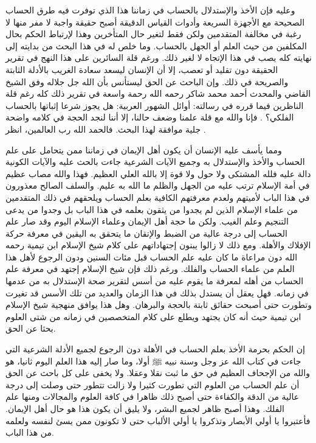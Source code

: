 وعليه فإن الأخذ والإستدلال بالحساب في زماننا هذا الذي توفرت فيه طرق الحساب الصحيحة مع الأجهزة السريعة وأدوات القياس الدقيقة أصبح حقيقة واجبة لا مفر منها لا رغبة في مخالفة المتقدمين ولكن فقط لتغير حال المتأخرين وهذا لإرتباط الحكم بحال المكلفين من حيث العلم أو الجهل بالحساب. وما خلص له في هذا البحث من بدايته إلى نهايته كله يصب في هذا الإتجاه لا لغير ذلك. ورغم قلة السائرين على هذا النهج في تقرير الحقيقة دون تقليد أو تعصب، إلا أن الإنسان ليسعد سعادة الغريب بالأدلة الثابتة والصريحة في ذلك. وإن الباحث عن الحق ليستأنس بأن الله جل جلاله وفق الشيخ القاضي والمحدث أحمد محمد شاكر رحمه الله رحمة واسعة في تقرير ذلك كله رغم قلة الناظرين فيما قرره في رسالته: أوائل الشهور العربية: هل يجوز شرعا إثباتها بالحساب الفلكي؟ \cite{shuhur_ahmidShakir}. فإنا والله مع قلة علمنا وضعف حالنا، إلا أننا  لنجد الحجة في كلامه واضحة جلية موافقة لهذا البحث. فالحمد الله رب العالمين، انظر .

ومما يأسف عليه الإنسان أن يكون أهل الإيمان في زماننا ممن يتحامل على علم الحساب والأخذ والإستدلال به وجميع الآيات الشرعية جاءت بالحث عليه والآيات الكونية دالة عليه فلله المشتكى ولا حول ولا قوة إلا بالله العلي العظيم. فهذا والله مصاب عظيم في أمة الإسلام ترتب عليه من الجهل والظلم ما الله به عليم. والسلف الصالح معذورون في هذا الباب لأميتهم ولعدم معرفتهم الكافية بعلم الحساب ويلحقهم في ذلك المتقدمين من علماء الإسلام الذين لم يجدوا من يثقون بعلمه في هذا الباب بل وجدوا من يدعى التنجيم وعلم الغيب. ولكن ما حجة أهل الإيمان وعلماء الإسلام اليوم وقد صار علم الحساب إلى درجة عالية من الضبط والإتقان ما يتحقق به اليقين في معرفة حركة الإفلاك والأهلة. ومع ذلك لا زالوا يبنون إجتهاداتهم على كلام شيخ الإسلام ابن تيمية رحمه الله دون مراعاة ما كان عليه علم الحساب قبل مئات السنين ودون الرجوع لأهل هذا العلم من علماء الحساب والفلك. ورغم ذلك فإن شيخ الإسلام إجتهد في معرفة علم الحساب من أهله لمعرفة ما يقوم عليه من أسس لتقرير صحة الإستدلال به من عدمها في زمانه. فهل يعقل أن يستدل بذلك في هذا الزمان والعديد من تلك الأسس قد تغيرت وتطورت حتى أصبحت حقائق ثابتة بالحجة والبرهان. وهل هذا يوافق منهجية شيخ الإسلام ابن تيمية حيث أنه كان يجتهد ويطلع على كلام المتخصصين في زمانه من شتى العلوم بحثا عن الحق. 

إن الحكم بحرمة الأخذ بعلم الحساب في الأهلة دون الرجوع لجميع الأدلة الشرعية التي جاءت في كتاب الله عز وجل وسنة نبيه ﷺ أولا، وما صار إليه هذا العلم اليوم ثانيا، هو والله من الإجحاف العظيم في حق ما ثبت نقلا وعقلا. ولا يخفى على كل باحث عن الحق أن علم الحساب من العلوم التي تطورت كثيرا ولا زالت تتطور حتى وصلت إلى درجة عالية من الدقة والكفاءة حتى أصبح ذلك ظاهرا في كافة العلوم والمجالات ومنها علم الفلك. وهذا أصبح ظاهر لجميع البشر، ولا يليق أن يكون هذا هو حال أهل الإيمان. فأعتبروا يا أولي الأبصار وتذكروا يا أولي الألباب حتى لا تكونون ممن يسئ لنفسه ولعلمه من هذا الباب.

